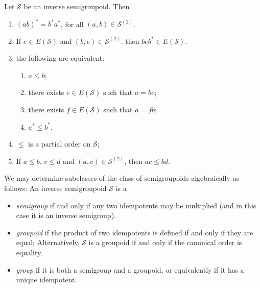 \begin{proposition}\label{prop:propertiesoperationsofinversesemigroupoid}
Let $\mathcal{S}$ be an inverse semigroupoid. Then
\begin{enumerate}[label=(\alph*)]
    \item\label{prop:propertiesoperationsofinversesemigroupoid1} $(ab)^*=b^*a^*$, for all $(a,b)\in\mathcal{S}^{(2)}$.
    \item\label{prop:propertiesoperationsofinversesemigroupoid2} If $e\in E(\mathcal{S})$ and $(b,e)\in \mathcal{S}^{(2)}$. then $beb^*\in E(\mathcal{S})$.
    \item\label{prop:propertiesoperationsofinversesemigroupoid3} the following are equivalent:
    \begin{enumerate}[label=(c.\roman*)]
        \item\label{prop:propertiesoperationsofinversesemigroupoid31} $a\leq b$;
        \item\label{prop:propertiesoperationsofinversesemigroupoid32} there exists $e\in E(\mathcal{S})$ such that $a=be$;
        \item\label{prop:propertiesoperationsofinversesemigroupoid33} there exists $f\in E(\mathcal{S})$ such that $a=fb$;
        \item\label{prop:propertiesoperationsofinversesemigroupoid34} $a^*\leq b^*$.
    \end{enumerate}
    \item\label{prop:propertiesoperationsofinversesemigroupoid4} $\leq$ is a partial order on $\mathcal{S}$;
    \item\label{prop:propertiesoperationsofinversesemigroupoid5} If $a\leq b$, $c\leq d$ and $(a,c)\in \mathcal{S}^{(2)}$, then $ac\leq bd$.
\end{enumerate}
\end{proposition}

We may determine subclasses of the class of semigroupoids algebraically as follows: An inverse semigroupoid $\mathcal{S}$ is a
\begin{itemize}
    \item \emph{semigroup} if and only if any two idempotents may be multiplied (and in this case it is an inverse semigroup).
    \item \emph{groupoid} if the product of two idempotents is defined if and only if they are equal; Alternatively, $\mathcal{S}$ is a groupoid if and only if the canonical order is equality.
    \item \emph{group} if it is both a semigroup and a groupoid, or equivalently if it has a unique idempotent.
\end{itemize}